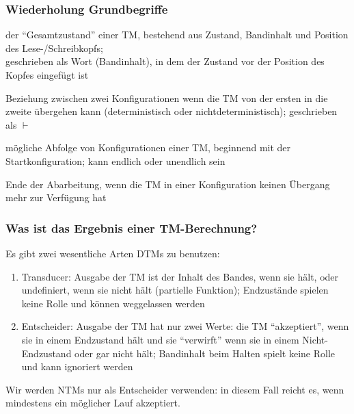 \documentclass[aspectratio=1610,onlymath]{beamer}
\begin{document}
\begin{frame}\frametitle{Wiederholung Grundbegriffe}

 der "`Gesamtzustand"' einer TM, bestehend aus Zustand, Bandinhalt und Position des Lese-/Schreibkopfs;\\[1ex]
geschrieben als Wort (Bandinhalt), in dem der Zustand vor der Position des Kopfes eingefügt ist
\bigskip

 Beziehung zwischen zwei Konfigurationen wenn die TM von der ersten in die zweite übergehen kann (deterministisch oder nichtdeterministisch); geschrieben als $\vdash$
\bigskip

 mögliche Abfolge von Konfigurationen einer TM, beginnend mit der Startkonfiguration; kann endlich oder unendlich sein
\bigskip

 Ende der Abarbeitung, wenn die TM in einer Konfiguration keinen Übergang mehr zur Verfügung hat

\end{frame}

\begin{frame}\frametitle{Was ist das Ergebnis einer TM-Berechnung?}

Es gibt zwei wesentliche Arten DTMs zu benutzen:

\begin{enumerate}[(1)]
\item \alert{Transducer:} Ausgabe der TM ist der Inhalt des Bandes, wenn sie hält, oder undefiniert, wenn sie nicht hält (partielle Funktion); Endzustände spielen keine Rolle und können weggelassen werden
\item \alert{Entscheider:} Ausgabe der TM hat nur zwei Werte: die TM "`akzeptiert"', wenn sie in einem Endzustand hält und sie "`verwirft"' wenn sie in einem Nicht-Endzustand oder gar nicht hält;
Bandinhalt beim Halten spielt keine Rolle und kann ignoriert werden
\end{enumerate}

Wir werden NTMs nur als Entscheider verwenden: in diesem Fall reicht es, wenn mindestens ein möglicher Lauf akzeptiert.

\end{frame}
\end{document}
